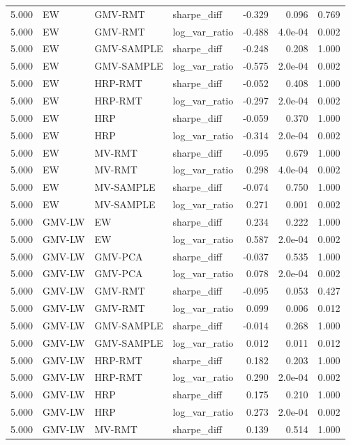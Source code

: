 \begin{table}[t]
{\begin{tabular}{rlllrrr}
5.000 & EW & GMV-RMT & sharpe\_diff & -0.329 & 0.096 & 0.769 \\
5.000 & EW & GMV-RMT & log\_var\_ratio & -0.488 & 4.0e-04 & 0.002 \\
5.000 & EW & GMV-SAMPLE & sharpe\_diff & -0.248 & 0.208 & 1.000 \\
5.000 & EW & GMV-SAMPLE & log\_var\_ratio & -0.575 & 2.0e-04 & 0.002 \\
5.000 & EW & HRP-RMT & sharpe\_diff & -0.052 & 0.408 & 1.000 \\
5.000 & EW & HRP-RMT & log\_var\_ratio & -0.297 & 2.0e-04 & 0.002 \\
5.000 & EW & HRP & sharpe\_diff & -0.059 & 0.370 & 1.000 \\
5.000 & EW & HRP & log\_var\_ratio & -0.314 & 2.0e-04 & 0.002 \\
5.000 & EW & MV-RMT & sharpe\_diff & -0.095 & 0.679 & 1.000 \\
5.000 & EW & MV-RMT & log\_var\_ratio & 0.298 & 4.0e-04 & 0.002 \\
5.000 & EW & MV-SAMPLE & sharpe\_diff & -0.074 & 0.750 & 1.000 \\
5.000 & EW & MV-SAMPLE & log\_var\_ratio & 0.271 & 0.001 & 0.002 \\
5.000 & GMV-LW & EW & sharpe\_diff & 0.234 & 0.222 & 1.000 \\
5.000 & GMV-LW & EW & log\_var\_ratio & 0.587 & 2.0e-04 & 0.002 \\
5.000 & GMV-LW & GMV-PCA & sharpe\_diff & -0.037 & 0.535 & 1.000 \\
5.000 & GMV-LW & GMV-PCA & log\_var\_ratio & 0.078 & 2.0e-04 & 0.002 \\
5.000 & GMV-LW & GMV-RMT & sharpe\_diff & -0.095 & 0.053 & 0.427 \\
5.000 & GMV-LW & GMV-RMT & log\_var\_ratio & 0.099 & 0.006 & 0.012 \\
5.000 & GMV-LW & GMV-SAMPLE & sharpe\_diff & -0.014 & 0.268 & 1.000 \\
5.000 & GMV-LW & GMV-SAMPLE & log\_var\_ratio & 0.012 & 0.011 & 0.012 \\
5.000 & GMV-LW & HRP-RMT & sharpe\_diff & 0.182 & 0.203 & 1.000 \\
5.000 & GMV-LW & HRP-RMT & log\_var\_ratio & 0.290 & 2.0e-04 & 0.002 \\
5.000 & GMV-LW & HRP & sharpe\_diff & 0.175 & 0.210 & 1.000 \\
5.000 & GMV-LW & HRP & log\_var\_ratio & 0.273 & 2.0e-04 & 0.002 \\
5.000 & GMV-LW & MV-RMT & sharpe\_diff & 0.139 & 0.514 & 1.000 \\

\end{tabular}}
\end{table}
